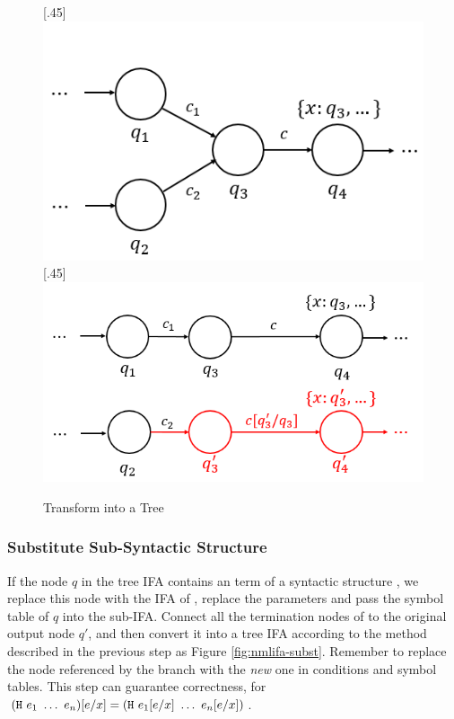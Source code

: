 \begin{figure}[t]
\centering
{}[.45\linewidth]{
    \includegraphics[scale=0.25]{images/nmlifa/nmlifa-tree-1.png}
}
[.45\linewidth]{
    \includegraphics[scale=0.25]{images/nmlifa/nmlifa-tree-2.png}
}
\caption{Transform into a Tree}
\label{fig:nmlifa-tree}
\end{figure}

\subsubsection{Substitute Sub-Syntactic Structure}

If the node $q$ in the tree IFA contains an term of a syntactic structure , we replace this node with the IFA of , replace the parameters and pass the symbol table of $q$ into the sub-IFA. Connect all the termination nodes of  to the original output node $q'$, and then convert it into a tree IFA according to the method described in the previous step as Figure \ref{fig:nmlifa-subst}. Remember to replace the node referenced by the branch with the \textit{new} one in conditions and symbol tables. This step can guarantee correctness, for $(\mbox{\tt H}~e_1~\ldots~e_n)[e/x] = (\mbox{\tt H}~e_1[e/x]~\ldots~e_n[e/x])$.

